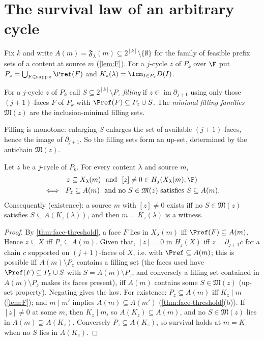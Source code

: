 \section{The survival law of an arbitrary cycle}\label{sec:atlas-law}
Fix $k$ and write $A(m)=\mathfrak F_\lambda(m)\subseteq 2^{[k]}\setminus\{\emptyset\}$ for the family of feasible prefix sets of a content at source $m$ (\cref{lem:F}). For a $j$-cycle $z$ of $P_k$ over $\F$ put $P_z=\bigcup_{F\in\operatorname{supp}z}\Pref(F)$ and $K_z(\lambda)=\lcm_{I\in P_z}D(I)$.
\begin{definition}\label{def:filling-family}
For a $j$-cycle $z$ of $P_k$ call $S\subseteq 2^{[k]}\setminus P_z$ \emph{filling} if $z\in\operatorname{im}\partial_{j+1}$ using only those $(j{+}1)$-faces $F$ of $P_k$ with $\Pref(F)\subseteq P_z\cup S$. The \emph{minimal filling families} $\mathfrak M(z)$ are the inclusion-minimal filling sets.
\end{definition}
Filling is monotone: enlarging $S$ enlarges the set of available $(j{+}1)$-faces, hence the image of $\partial_{j+1}$. So the filling sets form an up-set, determined by the antichain $\mathfrak M(z)$.
\begin{theorem}\label{thm:AT1}
Let $z$ be a $j$-cycle of $P_k$. For every content $\lambda$ and source $m$,
\begin{gather*}
z\subseteq X_\lambda(m)\ \text{ and }\ [z]\ne0\in H_j(X_\lambda(m);\F)\\
\iff\ P_z\subseteq A(m)\ \text{ and no } S\in\mathfrak M(z)\text{ satisfies } S\subseteq A(m).
\end{gather*}
Consequently (existence): a source $m$ with $[z]\neq0$ exists iff no $S\in\mathfrak M(z)$ satisfies $S\subseteq A(K_z(\lambda))$, and then $m=K_z(\lambda)$ is a witness.
\end{theorem}
\begin{proof}
By \cref{thm:face-threshold}, a face $F$ lies in $X_\lambda(m)$ iff $\Pref(F)\subseteq A(m)$. Hence $z\subseteq X$ iff $P_z\subseteq A(m)$. Given that, $[z]=0$ in $H_j(X)$ iff $z=\partial_{j+1}c$ for a chain $c$ supported on $(j{+}1)$-faces of $X$, i.e. with $\Pref\subseteq A(m)$; this is possible iff $A(m)\setminus P_z$ contains a filling set (the faces used have $\Pref(F)\subseteq P_z\cup S$ with $S=A(m)\setminus P_z$, and conversely a filling set contained in $A(m)\setminus P_z$ makes its faces present), iff $A(m)$ contains some $S\in\mathfrak M(z)$ (up-set property). Negating gives the law.
For existence: $P_z\subseteq A(m)$ iff $K_z\mid m$ (\cref{lem:F}); and $m\mid m'$ implies $A(m)\subseteq A(m')$ (\cref{thm:face-threshold}(b)). If $[z]\ne0$ at some $m$, then $K_z\mid m$, so $A(K_z)\subseteq A(m)$, and no $S\in\mathfrak M(z)$ lies in $A(m)\supseteq A(K_z)$. Conversely $P_z\subseteq A(K_z)$, so survival holds at $m=K_z$ when no $S$ lies in $A(K_z)$.
\end{proof}
